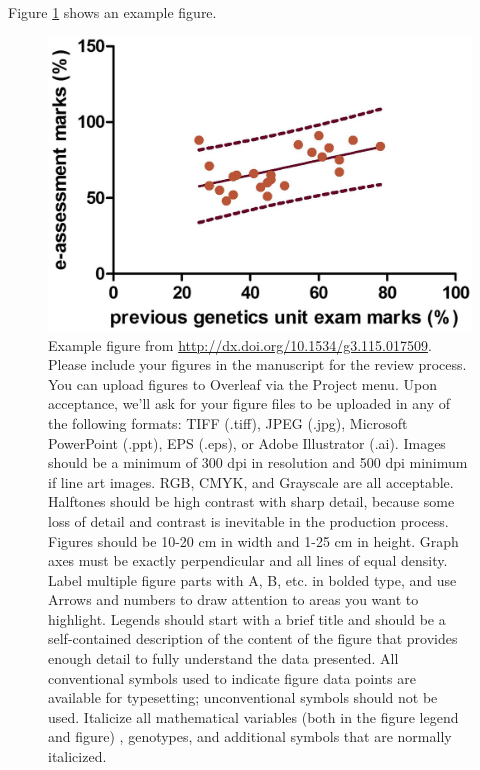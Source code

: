 \documentclass[9pt,twocolumn,twoside]{gsag3jnl}
\begin{document}
Figure \ref{fig:spectrum} shows an example figure.

\begin{figure}[htbp]
\renewcommand{\familydefault}{\sfdefault}\normalfont
\centering
\includegraphics[width=\linewidth]{example-figure-g3}
\caption{Example figure from \url{http://dx.doi.org/10.1534/g3.115.017509}. Please include your figures in the manuscript for the review process. You can upload figures to Overleaf via the Project menu. Upon acceptance, we'll ask for your figure files to be uploaded in any of the following formats: TIFF (.tiff), JPEG (.jpg), Microsoft PowerPoint (.ppt), EPS (.eps), or Adobe Illustrator (.ai).  Images should be a minimum of 300 dpi in resolution and 500 dpi minimum if line art images.  RGB, CMYK, and Grayscale are all acceptable. Halftones should be high contrast with sharp detail, because some loss of detail and contrast is inevitable in the production process. Figures should be 10-20 cm in width and 1-25 cm in height. Graph axes must be exactly perpendicular and all lines of equal density.
Label multiple figure parts with A, B, etc. in bolded type, and use Arrows and numbers to draw attention to areas you want to highlight. Legends should start with a brief title and should be a self-contained description of the content of the figure that provides enough detail to fully understand the data presented. All conventional symbols used to indicate figure data points are available for typesetting; unconventional symbols should not be used. Italicize all mathematical variables (both in the figure legend and figure) , genotypes, and additional symbols that are normally italicized.  
}%
\label{fig:spectrum}
\end{figure}
\end{document}
